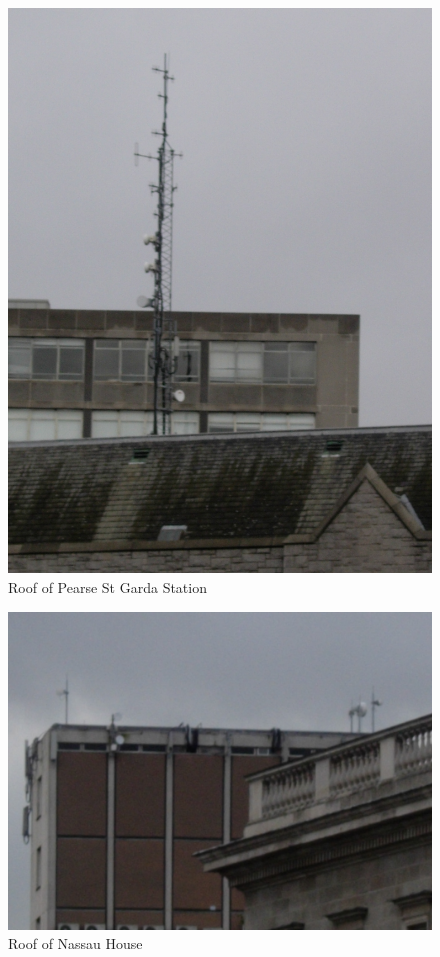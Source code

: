 \documentclass[a4paper,12pt]{article}
\begin{document}
\begin{figure}[h]

\includegraphics{9.png}

\caption{Roof of Pearse St Garda Station}

\end{figure}

\begin{figure}[h]

\includegraphics{11.png}

\caption{Roof of Nassau House}

\end{figure}
\end{document}
